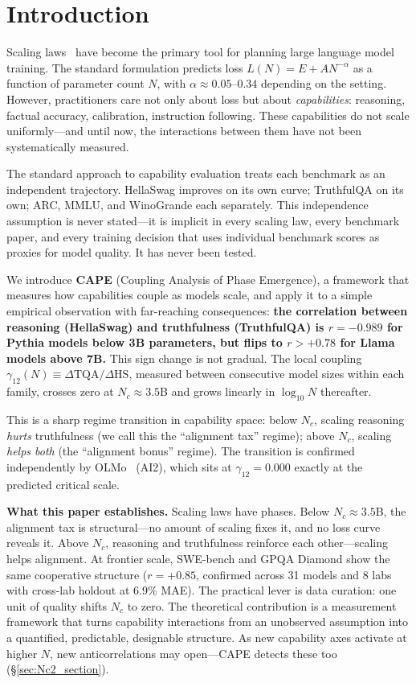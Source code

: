 \documentclass[11pt]{article}
\begin{document}
\section{Introduction}
\label{sec:intro}

Scaling laws~\cite{kaplan2020,chinchilla2022} have become the primary tool for planning large language model training.
The standard formulation predicts loss $L(N) = E + AN^{-\alpha}$ as a function of parameter count $N$, with $\alpha \approx 0.05$--$0.34$ depending on the setting.
However, practitioners care not only about loss but about \emph{capabilities}: reasoning, factual accuracy, calibration, instruction following.
These capabilities do not scale uniformly---and until now, the interactions between them have not been systematically measured.

The standard approach to capability evaluation treats each benchmark as an independent trajectory.
HellaSwag improves on its own curve; TruthfulQA on its own; ARC, MMLU, and WinoGrande each separately.
This independence assumption is never stated---it is implicit in every scaling law, every benchmark paper, and every training decision that uses individual benchmark scores as proxies for model quality.
It has never been tested.

We introduce \textbf{CAPE} (Coupling Analysis of Phase Emergence), a framework that measures how capabilities couple as models scale, and apply it to a simple empirical observation with far-reaching consequences:
\textbf{the correlation between reasoning (HellaSwag) and truthfulness (TruthfulQA) is $r = -0.989$ for Pythia models below 3B parameters, but flips to $r > +0.78$ for Llama~\cite{touvron2023} models above 7B.}
This sign change is not gradual.
The local coupling $\gamma_{12}(N) \equiv \Delta\mathrm{TQA}/\Delta\mathrm{HS}$, measured between consecutive model sizes within each family, crosses zero at $N_c \approx 3.5$B and grows linearly in $\log_{10} N$ thereafter.

This is a sharp regime transition in capability space:
below $N_c$, scaling reasoning \emph{hurts} truthfulness (we call this the ``alignment tax'' regime);
above $N_c$, scaling \emph{helps both} (the ``alignment bonus'' regime).
The transition is confirmed independently by OLMo~\cite{groeneveld2024} (AI2), which sits at $\gamma_{12} = 0.000$ exactly at the predicted critical scale.

\textbf{What this paper establishes.}
Scaling laws have phases.
Below $N_c \approx 3.5$B, the alignment tax is structural---no amount of scaling fixes it, and no loss curve reveals it.
Above $N_c$, reasoning and truthfulness reinforce each other---scaling helps alignment.
At frontier scale, SWE-bench and GPQA Diamond show the same cooperative structure ($r=+0.85$, confirmed across 31 models and 8 labs with cross-lab holdout at 6.9\% MAE).
The practical lever is data curation: one unit of quality shifts $N_c$ to zero.
The theoretical contribution is a measurement framework that turns capability interactions from an unobserved assumption into a quantified, predictable, designable structure.
As new capability axes activate at higher $N$, new anticorrelations may open---CAPE detects these too (\S\ref{sec:Nc2_section}).
\end{document}
